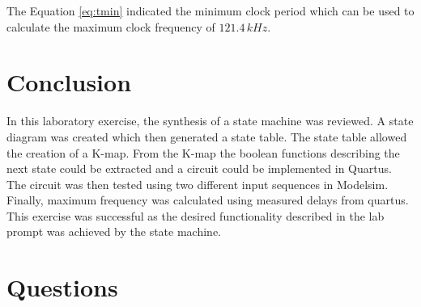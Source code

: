 \documentclass[CMPE]{KGCOEReport}
\begin{document}
The Equation \ref{eq:tmin} indicated the minimum clock period which can be used to calculate the maximum clock frequency of $121.4\,kHz$.

\section*{Conclusion}

In this laboratory exercise, the synthesis of a state machine was reviewed. A state diagram was created which then generated a state table. The state table allowed the creation of a K-map. From the K-map the boolean functions describing the next state could be extracted and a circuit could be implemented in Quartus. The circuit was then tested using two different input sequences in Modelsim. Finally, maximum frequency was calculated using measured delays from quartus. This exercise was successful as the desired functionality described in the lab prompt was achieved by the state machine.

\pagebreak

\section*{Questions}
\end{document}
